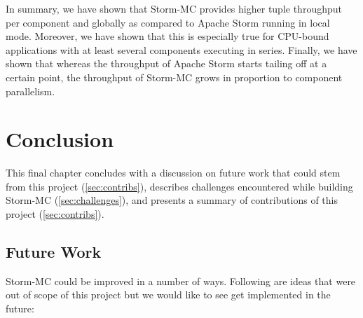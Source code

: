 \documentclass[bsc,deptreport,twoside,singlespacing,normalheadings,parskip]{infthesis}\usepackage[]{graphicx}\usepackage[]{color}
\begin{document}
In summary, we have shown that Storm-MC provides higher tuple throughput per component and globally as compared to Apache Storm running in local mode. Moreover, we have shown that this is especially true for CPU-bound applications with at least several components executing in series. Finally, we have shown that whereas the throughput of Apache Storm starts tailing off at a certain point, the throughput of Storm-MC grows in proportion to component parallelism.

\clearpage{}

\clearpage{}\chapter{Conclusion}

This final chapter concludes with a discussion on future work that could stem from this project (\ref{sec:contribs}), describes challenges encountered while building Storm-MC (\ref{sec:challenges}), and presents a summary of contributions of this project (\ref{sec:contribs}).

\section{Future Work}
\label{sec:future_work}

Storm-MC could be improved in a number of ways. Following are ideas that were out of scope of this project but we would like to see get implemented in the future:
\end{document}
